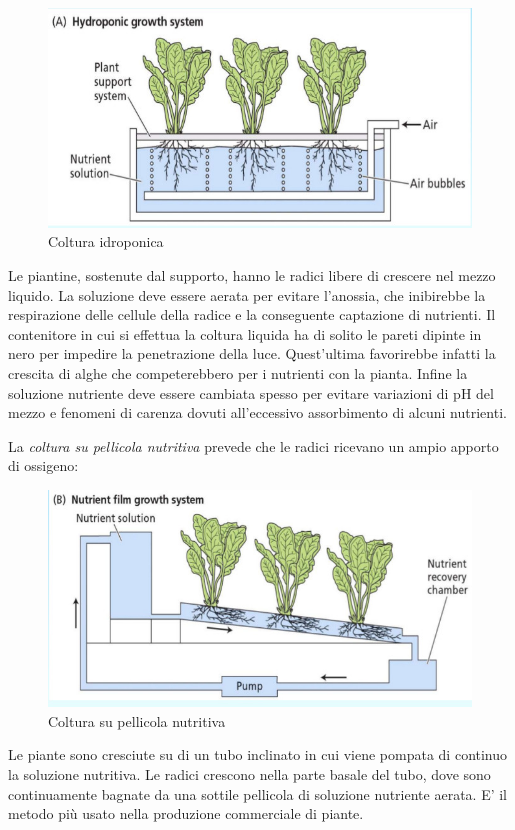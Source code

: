 \documentclass[a4paper,12pt]{book}
\begin{document}
\begin{figure}[H]
\centering
\includegraphics[scale=0.4]{immagini/idroponica.jpg}
\caption{Coltura idroponica}
\end{figure}
Le piantine, sostenute dal supporto, hanno le radici libere di crescere nel mezzo liquido. La soluzione deve essere aerata per evitare l’anossia, che inibirebbe la respirazione delle cellule della radice e la conseguente captazione di
nutrienti. Il contenitore in cui si effettua la coltura liquida ha di solito le pareti dipinte in nero per impedire la
penetrazione della luce. Quest’ultima favorirebbe infatti la crescita di alghe che competerebbero per i nutrienti con la pianta. Infine la soluzione nutriente deve essere cambiata spesso per evitare variazioni di pH del mezzo e fenomeni di carenza dovuti all’eccessivo assorbimento di alcuni nutrienti.

La \emph{coltura su pellicola nutritiva} prevede che le radici ricevano un ampio apporto di ossigeno:
\begin{figure}[H]
\centering
\includegraphics[scale=0.4]{immagini/pellicola.jpg}
\caption{Coltura su pellicola nutritiva}
\end{figure}
Le piante sono cresciute su di un tubo inclinato in cui viene pompata di continuo la soluzione nutritiva. Le radici
crescono nella parte basale del tubo, dove sono continuamente bagnate da una sottile pellicola di soluzione
nutriente aerata. E’ il metodo più usato nella produzione commerciale di piante.
\end{document}
